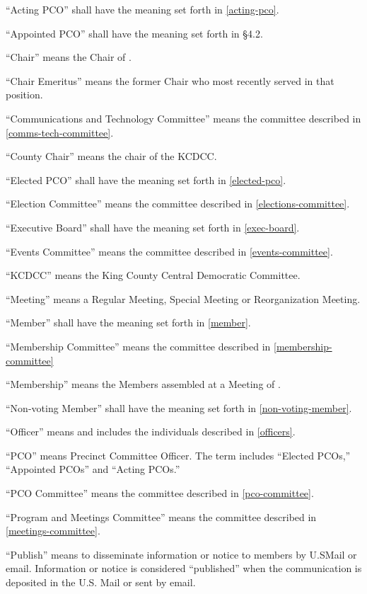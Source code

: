 \begin{alphalist}
    \item “Acting PCO” shall have the meaning set forth in \autoref{acting-pco}.
    \item “Appointed PCO” shall have the meaning set forth in \S 4.2.
    \item “Chair” means the Chair of \thedistrict{}.
    \item “Chair Emeritus” means the former Chair who most recently served in that position.
    \item “Communications and Technology Committee” means the committee described in \autoref{comms-tech-committee}.
    \item “County Chair” means the chair of the KCDCC.
    \item “Elected PCO” shall have the meaning set forth in \autoref{elected-pco}.
    \item “Election Committee” means the committee described in \autoref{elections-committee}.
    \item “Executive Board” shall have the meaning set forth in \autoref{exec-board}.
    \item “Events Committee” means the committee described in \autoref{events-committee}.
    \item “KCDCC” means the King County Central Democratic Committee.
    \item “Meeting” means a Regular Meeting, Special Meeting or Reorganization Meeting.
    \item “Member” shall have the meaning set forth in \autoref{member}.
    \item “Membership Committee” means the committee described in \autoref{membership-committee}
    \item “Membership” means the Members assembled at a Meeting of \thedistrict{}.
    \item “Non-voting Member” shall have the meaning set forth in \autoref{non-voting-member}.
    \item “Officer” means and includes the individuals described in \autoref{officers}.
    \item “PCO” means Precinct Committee Officer. The term includes “Elected PCOs,” “Appointed PCOs” and “Acting PCOs.”
    \item “PCO Committee” means the committee described in \autoref{pco-committee}.
    \item “Program and Meetings Committee” means the committee described in \autoref{meetings-committee}.
    \item “Publish” means to disseminate information or notice to members by U.SMail or email.  Information or notice is considered “published” when the communication is deposited in the U.S. Mail or sent by email.

\end{alphalist}
